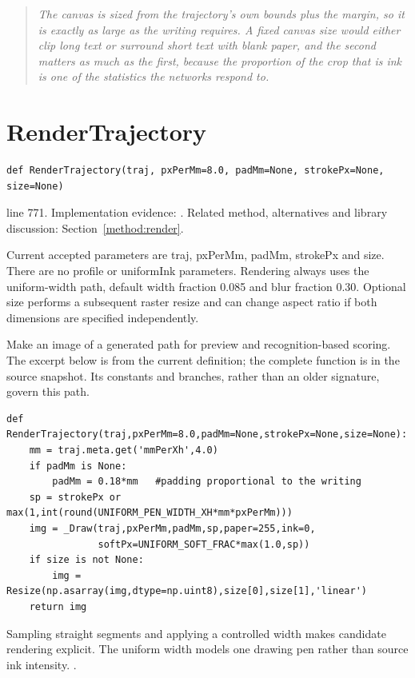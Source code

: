 \begin{quote}\small\itshape The canvas is sized from the trajectory's own bounds plus the margin, so it is exactly as large as the writing requires. A fixed canvas size would either clip long text or surround short text with blank paper, and the second matters as much as the first, because the proportion of the crop that is ink is one of the statistics the networks respond to.\end{quote}


\section{RenderTrajectory}\label{fn:synthesise:RenderTrajectory}
\begin{lstlisting}[style=sig]
def RenderTrajectory(traj, pxPerMm=8.0, padMm=None, strokePx=None, size=None)
\end{lstlisting}
 line 771. Implementation evidence: \cite{code2026}. Related method, alternatives and library discussion: Section~\ref{method:render}.


Current accepted parameters are traj, pxPerMm, padMm, strokePx and size. There are no profile or uniformInk parameters. Rendering always uses the uniform-width path, default width fraction 0.085 and blur fraction 0.30. Optional size performs a subsequent raster resize and can change aspect ratio if both dimensions are specified independently.


Make an image of a generated path for preview and recognition-based scoring. The excerpt below is from the current definition; the complete function is in the source snapshot. Its constants and branches, rather than an older signature, govern this path.


\begin{lstlisting}[style=plain]
def RenderTrajectory(traj,pxPerMm=8.0,padMm=None,strokePx=None,size=None):
    mm = traj.meta.get('mmPerXh',4.0)
    if padMm is None:
        padMm = 0.18*mm   #padding proportional to the writing
    sp = strokePx or max(1,int(round(UNIFORM_PEN_WIDTH_XH*mm*pxPerMm)))
    img = _Draw(traj,pxPerMm,padMm,sp,paper=255,ink=0,
                softPx=UNIFORM_SOFT_FRAC*max(1.0,sp))
    if size is not None:
        img = Resize(np.asarray(img,dtype=np.uint8),size[0],size[1],'linear')
    return img
\end{lstlisting}
Sampling straight segments and applying a controlled width makes candidate rendering explicit. The uniform width models one drawing pen rather than source ink intensity. \cite{pillowdraw,opencvdraw,code2026}.



